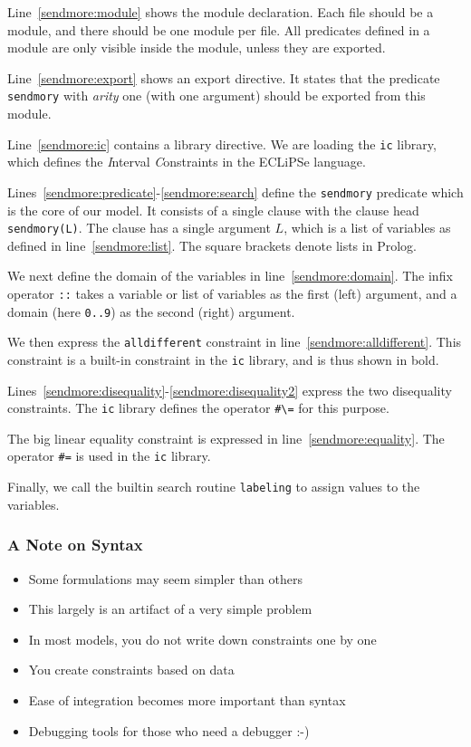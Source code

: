 Line~\ref{sendmore:module} shows the module declaration. Each file should be a module, and there should be one module per file. All predicates defined in a module are only visible inside the module, unless they are exported.

Line~\ref{sendmore:export} shows an export directive. It states that the predicate \texttt{sendmory} with {\em arity} one (with one argument) should be exported from this module.

Line~\ref{sendmore:ic} contains a library directive. We are loading the \texttt{ic} library, which defines the {\em I}nterval {\em C}onstraints in the ECLiPSe language.
 
Lines~\ref{sendmore:predicate}-\ref{sendmore:search} define the \texttt{sendmory} predicate which is the core of our model. It consists of a single clause with the clause head \texttt{sendmory(L)}. The clause has a single argument $L$, which is a list of variables as defined in line~\ref{sendmore:list}. The square brackets denote lists in Prolog.

We next define the domain of the variables in line~\ref{sendmore:domain}. The infix operator \texttt{::}\index{::} takes a variable or list of variables as the first (left) argument, and a domain (here \texttt{0..9}) as the second (right) argument.

We then express the \texttt{alldifferent} constraint in line~\ref{sendmore:alldifferent}. This constraint is a built-in constraint in the \texttt{ic} library, and is thus shown in bold.

Lines~\ref{sendmore:disequality}-\ref{sendmore:disequality2} express the two disequality constraints. The \texttt{ic} library defines the operator \verb$#\=$ for this purpose.

The big linear equality constraint is expressed in line~\ref{sendmore:equality}. The operator \texttt{\#=} is used in the \texttt{ic} library.

Finally, we call the builtin search routine \texttt{labeling} to assign values to the variables.

\begin{frame}
\frametitle{A Note on Syntax}
\label{sendmore:continue}
\begin{itemize}
\item Some formulations may seem simpler than others
\item This largely is an artifact of a very simple problem
\item In most models, you do not write down constraints one by one
\item You create constraints based on data
\item Ease of integration becomes more important than syntax
\item Debugging tools for those who need a debugger :-) 
\end{itemize}
\end{frame}


